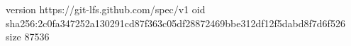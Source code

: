 version https://git-lfs.github.com/spec/v1
oid sha256:2c0fa347252a130291cd87f363c05df28872469bbe312df12f5dabd8f7d6f526
size 87536
